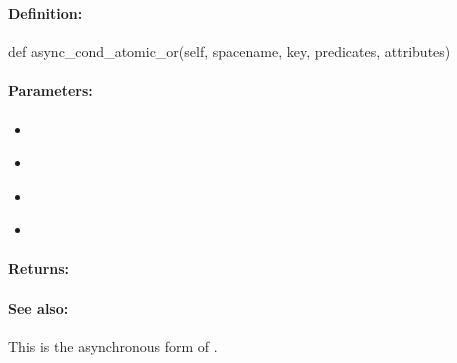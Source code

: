 \pagebreak
\subsubsection{}
\label{api:python:async_cond_atomic_or}


\paragraph{Definition:}
\begin{pythoncode}
def async_cond_atomic_or(self, spacename, key, predicates, attributes)
\end{pythoncode}

\paragraph{Parameters:}
\begin{itemize}[noitemsep]
\item {}\\

\item {}\\

\item {}\\

\item {}\\

\end{itemize}

\paragraph{Returns:}


\paragraph{See also:}  This is the asynchronous form of .

\pagebreak
\subsubsection{}
\label{api:python:atomic_xor}


